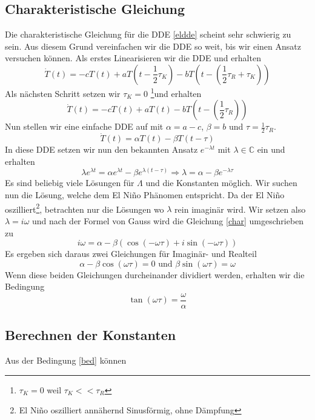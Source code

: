 \subsection{Charakteristische Gleichung}
Die charakteristische Gleichung für die DDE \ref{eldde} scheint sehr schwierig zu sein. 
Aus diesem Grund vereinfachen wir die DDE so weit, bis wir einen Ansatz versuchen können.
Als erstes Linearisieren wir die DDE und erhalten
\begin{equation}
	\dot{T}(t)=-cT(t)+aT(t-\frac{1}{2}\tau_K)-bT(t-(\frac{1}{2}\tau_R+\tau_K))
\end{equation}
Als nächsten Schritt setzen wir $\tau_K=0$ \footnote{$\tau_K=0$ weil $\tau_K << \tau_R$}und erhalten
\begin{equation}
	\dot{T}(t)=-cT(t)+aT(t)-bT(t-(\frac{1}{2}\tau_R))
\end{equation}
Nun stellen wir eine einfache DDE auf mit $\alpha = a-c$, $\beta = b$ und $\tau = \frac{1}{2}\tau_R$.
\begin{equation}
	\dot{T}(t)=\alpha T(t)-\beta T(t-\tau)
\end{equation}
In diese DDE setzen wir nun den bekannten Ansatz $e^{-\lambda t}$ mit $\lambda \in \mathbb{C}$ ein und erhalten
\begin{equation} \label{char}
	\lambda e^{\lambda t} = \alpha e^{\lambda t} - \beta e^{\lambda(t-\tau)} \Longrightarrow \lambda = \alpha-\beta e^{-\lambda \tau}
\end{equation}
Es sind beliebig viele Lösungen für $\Lambda$ und die Konstanten möglich.
Wir suchen nun die Lösung, welche dem El Niño Phänomen entspricht.
Da der El Niño oszilliert\footnote{El Niño oszilliert annähernd Sinusförmig, ohne Dämpfung}, betrachten nur die Lösungen wo $\lambda$ rein imaginär wird. %
Wir setzen also $\lambda = i\omega$ und nach der Formel von Gauss wird die Gleichung \ref{char} umgeschrieben zu 
\begin{equation}
	 i\omega = \alpha-\beta(\cos(-\omega \tau)+i\sin(-\omega \tau))
\end{equation}
Es ergeben sich daraus zwei Gleichungen für Imaginär- und Realteil
\begin{equation}
  	\alpha-\beta\cos(\omega \tau) = 0 \text{ und } \beta\sin(\omega\tau)=\omega
\end{equation}
Wenn diese beiden Gleichungen durcheinander dividiert werden, erhalten wir die Bedingung
\begin{equation} \label{bed}
	\tan(\omega\tau)=\frac{\omega}{\alpha}
\end{equation}
  	
\subsection{Berechnen der Konstanten}
Aus der Bedingung \ref{bed} können %
